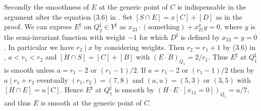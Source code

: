 \documentclass[a4paper,11pt]{amsart}
\theoremstyle{definition}
\theoremstyle{remark}
\numberwithin{equation}{section}
\newcommand{\something}{\mathrm{something}}
\begin{document}
Secondly the smoothness of $E$ at the generic point of $C$ is indispensable
in the argument after the equation (3.6) in \cite[Theorem 3.15]{Ka03}.
Set $[S \cap E]=x[C]+[D]$ as in the proof.
We can express $E^\sharp$ on $Q_2^\sharp \in Y^\sharp$ as
$x_{23}\cdot(\something)+x_{21}^xy=0$,
where $y$ is the semi-invariant function with weight $-1$
for which $D^\sharp$ is defined by $x_{23}=y=0$.
In particular we have $r_2 \mid x$ by considering weights.
Then $r_2=r_1+1$ by (3.6) in \cite[Theorem 3.15]{Ka03},
$a<r_1<r_2$ and $[H \cap S]=[C]+[B]$ with $(E \cdot B)_{Q_1}=2/r_1$.
Thus $E^\sharp$ at $Q_1^\sharp$ is smooth unless
$a=r_1-2$ or $(r_1-1)/2$.
If $a=r_1-2$ or $(r_1-1)/2$ then by $a \mid r_1+r_2$
eventually $(r_1,r_2)=(7,8)$ and
$(a,u)=(5,3)$ or $(3,5)$ with $[H \cap E]=u[C]$.
Hence $E^\sharp$ at $Q_1^\sharp$ is smooth
by $(H \cdot E \cdot [x_{11}=0])_{Q_1}=u/7$,
and thus $E$ is smooth at the generic point of $C$.
\end{document}
